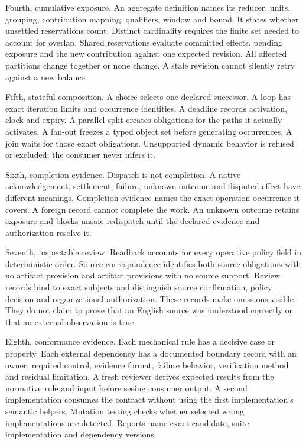 \documentclass[
  american,
  11pt,
  letterpaper,
]{article}
\newcounter{none} %
\begin{document}
Fourth, cumulative exposure. An aggregate definition names its reducer,
units, grouping, contribution mapping, qualifiers, window and bound. It
states whether unsettled reservations count. Distinct cardinality
requires the finite set needed to account for overlap. Shared
reservations evaluate committed effects, pending exposure and the new
contribution against one expected revision. All affected partitions
change together or none change. A stale revision cannot silently retry
against a new balance.

Fifth, stateful composition. A choice selects one declared successor. A
loop has exact iteration limits and occurrence identities. A deadline
records activation, clock and expiry. A parallel split creates
obligations for the paths it actually activates. A fan-out freezes a
typed object set before generating occurrences. A join waits for those
exact obligations. Unsupported dynamic behavior is refused or excluded;
the consumer never infers it.

Sixth, completion evidence. Dispatch is not completion. A native
acknowledgement, settlement, failure, unknown outcome and disputed
effect have different meanings. Completion evidence names the exact
operation occurrence it covers. A foreign record cannot complete the
work. An unknown outcome retains exposure and blocks unsafe redispatch
until the declared evidence and authorization resolve it.

Seventh, inspectable review. Readback accounts for every operative
policy field in deterministic order. Source correspondence identifies
both source obligations with no artifact provision and artifact
provisions with no source support. Review records bind to exact subjects
and distinguish source confirmation, policy decision and organizational
authorization. These records make omissions visible. They do not claim
to prove that an English source was understood correctly or that an
external observation is true.

Eighth, conformance evidence. Each mechanical rule has a decisive case
or property. Each external dependency has a documented boundary record
with an owner, required control, evidence format, failure behavior,
verification method and residual limitation. A fresh reviewer derives
expected results from the normative rule and input before seeing
consumer output. A second implementation consumes the contract without
using the first implementation's semantic helpers. Mutation testing
checks whether selected wrong implementations are detected. Reports name
exact candidate, suite, implementation and dependency versions.
\end{document}
